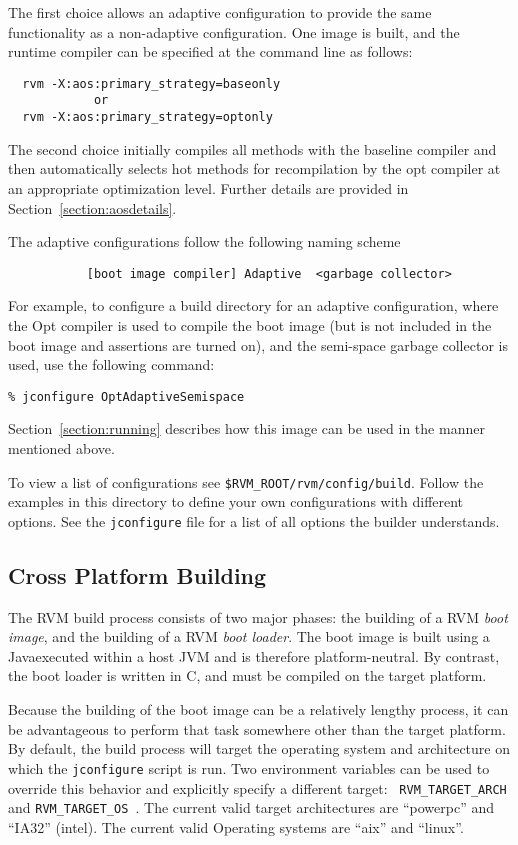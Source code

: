 The first choice allows an adaptive configuration to provide the same
functionality as a non-adaptive configuration.  One image is built,
and the runtime compiler can be specified at the command line as
follows:
\begin{verbatim}
  rvm -X:aos:primary_strategy=baseonly
            or
  rvm -X:aos:primary_strategy=optonly
\end{verbatim}

The second choice initially compiles all methods with the
baseline compiler and then automatically selects hot methods for
recompilation by the opt compiler at an appropriate optimization
level. Further details are provided in Section~\ref{section:aosdetails}.

The adaptive configurations follow the following naming scheme
\begin{verbatim}
           [boot image compiler] Adaptive  <garbage collector>
\end{verbatim}

For example, to configure a build 
directory for an adaptive configuration, where the Opt compiler is 
used to compile the boot image (but is not included in the boot image
and assertions are turned on), and the semi-space garbage collector is
used, use the following command:

\begin{verbatim}
% jconfigure OptAdaptiveSemispace
\end{verbatim}

Section~\ref{section:running} describes how this image can be used in
the manner mentioned above.

To view a list of configurations see 
{\tt \$RVM\_ROOT/rvm/config/build}.  Follow the examples in this
directory to define your own configurations with different options.  See
the {\tt jconfigure} file for a list of all options the builder
understands.

\subsection{Cross Platform Building}

The RVM build process consists of two major phases: the building of a
RVM {\em boot image}, and the building of a RVM {\em boot loader}.
The boot image is built using a Java\trademark executed within a host
JVM and is therefore platform-neutral.  By contrast, the boot loader
is written in C, and must be compiled on the target platform.

Because the building of the boot image can be a relatively lengthy
process, it can be advantageous to perform that task somewhere other
than the target platform.  By default, the build process will target
the operating system and architecture on which the {\tt jconfigure}
script is run.  
    Two environment variables can be used to
override this behavior and explicitly specify a different target: {\tt
  RVM\_TARGET\_ARCH } and {\tt RVM\_TARGET\_OS }. The current valid target
architectures are ``powerpc'' and ``IA32'' (intel). The current valid
Operating systems are ``aix'' and ``linux''.

